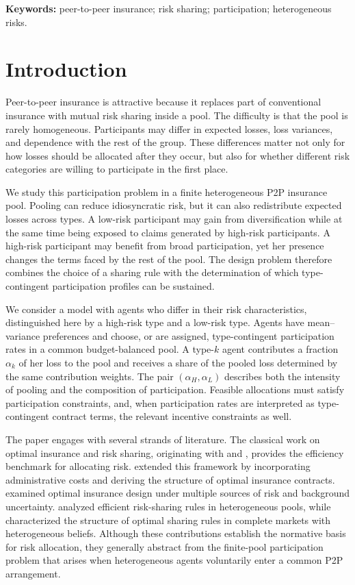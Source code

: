 \documentclass[a4paper,12pt]{article}
\theoremstyle{definition}
\theoremstyle{remark}
\newcommand{\1}{\mathbf{1}}
\begin{document}
\noindent\textbf{Keywords:} peer-to-peer insurance; risk sharing; participation; heterogeneous risks.\\


\section{Introduction}

Peer-to-peer insurance is attractive because it replaces part of conventional insurance with mutual risk sharing inside a pool. The difficulty is that the pool is rarely homogeneous. Participants may differ in expected losses, loss variances, and dependence with the rest of the group. These differences matter not only for how losses should be allocated after they occur, but also for whether different risk categories are willing to participate in the first place.

We study this participation problem in a finite heterogeneous P2P insurance pool. Pooling can reduce idiosyncratic risk, but it can also redistribute expected losses across types. A low-risk participant may gain from diversification while at the same time being exposed to claims generated by high-risk participants. A high-risk participant may benefit from broad participation, yet her presence changes the terms faced by the rest of the pool. The design problem therefore combines the choice of a sharing rule with the determination of which type-contingent participation profiles can be sustained.

We consider a model with agents who differ in their risk characteristics, distinguished here by a high-risk type and a low-risk type. Agents have mean--variance preferences and choose, or are assigned, type-contingent participation rates in a common budget-balanced pool. A type-\(k\) agent contributes a fraction \(\alpha_k\) of her loss to the pool and receives a share of the pooled loss determined by the same contribution weights. The pair \((\alpha_H,\alpha_L)\) describes both the intensity of pooling and the composition of participation. Feasible allocations must satisfy participation constraints, and, when participation rates are interpreted as type-contingent contract terms, the relevant incentive constraints as well.

The paper engages with several strands of literature. The classical work on optimal insurance and risk sharing, originating with \citet{Borch1962} and \citet{Arrow1974}, provides the efficiency benchmark for allocating risk. \citet{Raviv1979} extended this framework by incorporating administrative costs and deriving the structure of optimal insurance contracts. \citet{CumminsMahul2004} examined optimal insurance design under multiple sources of risk and background uncertainty. \citet{DanaScarsini2007} analyzed efficient risk-sharing rules in heterogeneous pools, while \citet{JouiniSchachermayerTouzi2008} characterized the structure of optimal sharing rules in complete markets with heterogeneous beliefs. Although these contributions establish the normative basis for risk allocation, they generally abstract from the finite-pool participation problem that arises when heterogeneous agents voluntarily enter a common P2P arrangement.
\end{document}
